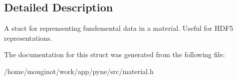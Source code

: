 \subsection{Detailed Description}
A stuct for reprensenting fundemental data in a material. Useful for H\+D\+F5 representations. 

The documentation for this struct was generated from the following file\+:\begin{DoxyCompactItemize}
\item 
/home/mouginot/work/app/pyne/src/material.\+h\end{DoxyCompactItemize}
